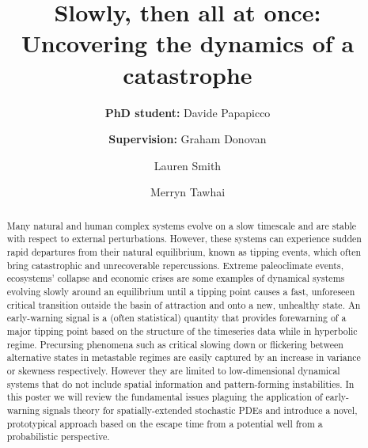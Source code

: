\documentclass[dvipsnames, table, 11pt]{article}
\begin{document}
\title{Slowly, then all at once: Uncovering the dynamics of a catastrophe}

\author[*]{\textbf{PhD student:} Davide Papapicco}
\author[*]{\authorcr \textbf{Supervision:} Graham Donovan}
\author[*]{Lauren Smith}
\author[$\dagger$]{Merryn Tawhai}


\date{}

\maketitle

\begin{abstract}
        Many natural and human complex systems evolve on a slow timescale and are stable with respect to external perturbations. 
        However, these systems can experience sudden rapid departures from their natural equilibrium, known as tipping events, which often bring catastrophic and unrecoverable repercussions.
        Extreme paleoclimate events, ecosystems’ collapse and economic crises are some examples of dynamical systems evolving slowly around an equilibrium until a tipping point causes a fast, unforeseen critical transition outside the basin of attraction and onto a new, unhealthy state. 
        An early-warning signal is a (often statistical) quantity that provides forewarning of a major tipping point based on the structure of the timeseries data while in hyperbolic regime.
        Precursing phenomena such as critical slowing down or flickering between alternative states in metastable regimes are easily captured by an increase in variance or skewness respectively. 
        However they are limited to low-dimensional dynamical systems that do not include spatial information and pattern-forming instabilities.
        In this poster we will review the fundamental issues plaguing the application of early-warning signals theory for spatially-extended stochastic PDEs and introduce a novel, prototypical approach based on the escape time from a potential well from a probabilistic perspective.
\end{abstract}
\end{document}
